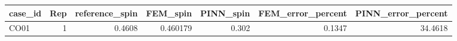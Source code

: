\begin{tabular}{lrrrrrr}
\toprule
case\_id & Rep & reference\_spin & FEM\_spin & PINN\_spin & FEM\_error\_percent & PINN\_error\_percent \\
\midrule
CO01 & 1 & 0.4608 & 0.460179 & 0.302 & 0.1347 & 34.4618 \\
\bottomrule
\end{tabular}
